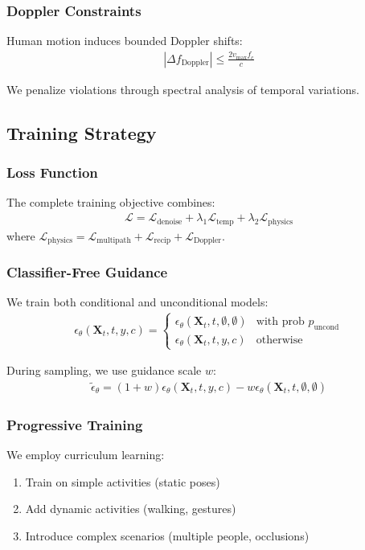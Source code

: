 \documentclass[journal]{IEEEtran}
\begin{document}
\subsubsection{Doppler Constraints}
Human motion induces bounded Doppler shifts:
\begin{align}
|\Delta f_{\text{Doppler}}| \leq \frac{2v_{\text{max}}f_c}{c}
\end{align}

We penalize violations through spectral analysis of temporal variations.

\subsection{Training Strategy}

\subsubsection{Loss Function}
The complete training objective combines:
\begin{align}
\mathcal{L} = \mathcal{L}_{\text{denoise}} + \lambda_1\mathcal{L}_{\text{temp}} + \lambda_2\mathcal{L}_{\text{physics}}
\end{align}
where $\mathcal{L}_{\text{physics}} = \mathcal{L}_{\text{multipath}} + \mathcal{L}_{\text{recip}} + \mathcal{L}_{\text{Doppler}}$.

\subsubsection{Classifier-Free Guidance}
We train both conditional and unconditional models:
\begin{align}
\epsilon_\theta(\mathbf{X}_t, t, y, c) = \begin{cases}
\epsilon_\theta(\mathbf{X}_t, t, \emptyset, \emptyset) & \text{with prob } p_{\text{uncond}} \\
\epsilon_\theta(\mathbf{X}_t, t, y, c) & \text{otherwise}
\end{cases}
\end{align}

During sampling, we use guidance scale $w$:
\begin{align}
\tilde{\epsilon}_\theta = (1+w)\epsilon_\theta(\mathbf{X}_t, t, y, c) - w\epsilon_\theta(\mathbf{X}_t, t, \emptyset, \emptyset)
\end{align}

\subsubsection{Progressive Training}
We employ curriculum learning:
\begin{enumerate}
\item Train on simple activities (static poses)
\item Add dynamic activities (walking, gestures)
\item Introduce complex scenarios (multiple people, occlusions)
\end{enumerate}
\end{document}
